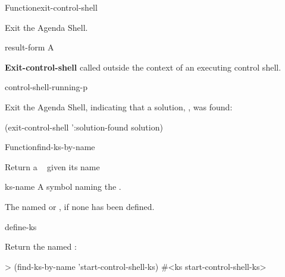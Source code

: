 \documentclass[10pt,twoside,english,pdftex]{article}
\begin{document}
\begin{functiondoc}{Function}{exit-control-shell}%
  { \superstar}
%
%
%
%

\fnsyntax

\fnpurpose Exit the Agenda Shell.

\fnpackage {}

\fnmodule {}

\fnargs
\begin{args}{result-form}
 A 
\end{args}

\fnerrors \textbf{Exit-control-shell} called outside the context of an
executing control shell.

\begin{alsos}{control-shell-running-p}
\end{alsos}

\fnexample Exit the Agenda Shell, indicating that a solution, 
, was found:
%
\W\supp
\begin{example}
  (exit-control-shell ':solution-found solution)
\end{example}

\end{functiondoc}

 
\begin{functiondoc}{Function}{find-ks-by-name}{ 
  \returns{} }
%

\fnsyntax

\fnpurpose Return a ~  given its name

\fnpackage {}

\fnmodule {}

\fnargs
\begin{args}{ks-name}
\arg[ks-name] A symbol naming the .
\end{args}

\fnreturns The   named 
or \nil, if none has been defined.

\begin{alsos}{define-ks}
\also[define-ks]
\also[ks]
\end{alsos}

\fnexample Return the  named :
%
\W\supp
\begin{example}
> (find-ks-by-name 'start-control-shell-ks)
#<ks start-control-shell-ks>
\end{example}

\end{functiondoc}
\end{document}
